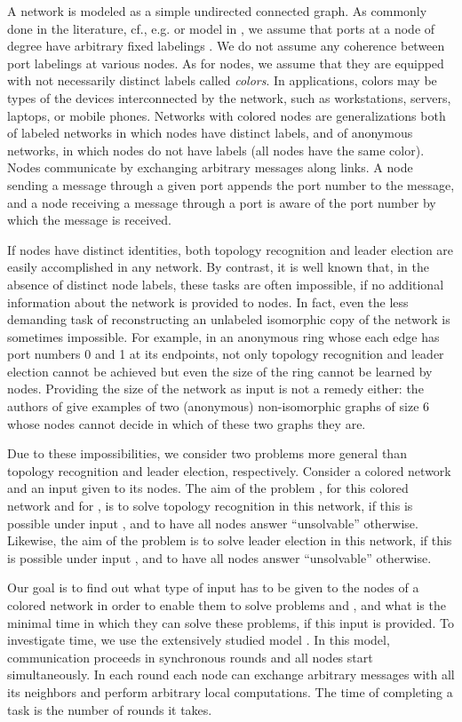 \documentclass[a4paper,10pt]{article}
\begin{document}
A network is modeled as a simple undirected connected graph. As commonly done in the literature, cf., e.g. \cite{YK3} {or  model in \cite{AGPV}}, we assume that
ports at a node of degree  have arbitrary fixed labelings  .
We do not assume any coherence between port labelings at various nodes.
As for nodes, we assume that they are equipped with not necessarily distinct labels called {\em colors}.  In applications, colors may be types of the devices interconnected by the network, 
such as workstations, servers, laptops, or mobile phones.
Networks with colored nodes are generalizations both of labeled networks in which nodes have distinct labels, and of anonymous 
networks, in which nodes do not have labels (all nodes have the same color). 
Nodes communicate by exchanging arbitrary messages along links. A node sending a message
through a given port appends the port number to the message, and a node receiving a message
through a port is aware of the port number by which the message is received.

If nodes have distinct identities, both topology recognition and leader election are easily accomplished in any network. By contrast, it is well known that, in the absence of distinct node labels, these tasks are often impossible, if no additional information about the network is provided to nodes. In fact, even the less demanding task of reconstructing an unlabeled isomorphic copy of the
network is sometimes impossible. 
For example, in an anonymous ring whose each edge has port numbers 0 and 1 at its
endpoints, not only topology recognition and leader election cannot be achieved but even 
the size of the ring cannot be learned by nodes. Providing the size of the network as input is not a remedy
either: the authors of \cite{YK3} give examples of two (anonymous) non-isomorphic graphs of size 6 whose
nodes cannot decide in which of these two graphs they are.

Due to these impossibilities, we consider two problems more general than topology recognition
and leader election, respectively.
Consider a colored network and an input  given to its nodes.
The aim of the problem , for this colored network and for , is to solve topology recognition in this network, if this is possible under input , and to have all nodes answer ``unsolvable'' otherwise.
Likewise, the aim of the problem  is to solve leader election in this network, if this is possible under input , and to have all nodes answer ``unsolvable'' otherwise. 

Our goal is to find out what type of input has to be given to the nodes of a colored network in order to enable them to solve problems  and , and what is the minimal time in which they can solve these problems, if this input is provided.
To investigate time, we use the extensively studied  model \cite{Pe}.
In this model, communication proceeds in synchronous rounds and all nodes start simultaneously.
In each round each node can exchange arbitrary messages with all its neighbors and perform arbitrary local computations. 
The time of completing a task is the number of rounds it takes.
\end{document}
